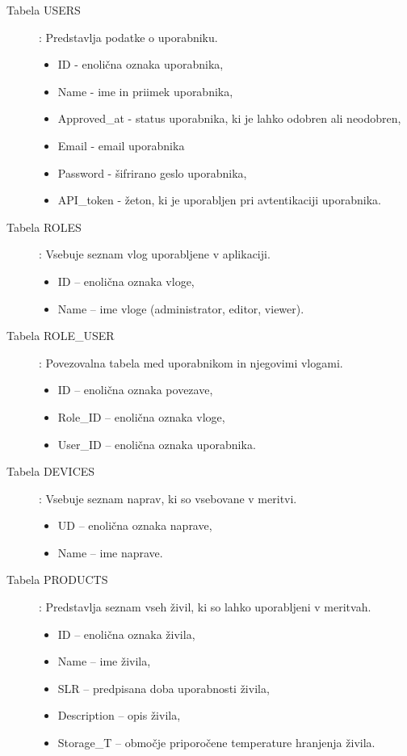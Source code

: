 \documentclass[a4paper, 12pt]{book}
\begin{document}
\begin{description}
\item[Tabela USERS] : Predstavlja podatke o uporabniku.
	\begin{itemize}
		\item ID - enolična oznaka uporabnika,
		\item Name - ime in priimek uporabnika,
		\item Approved\_at - status uporabnika, ki je lahko odobren ali neodobren,
		\item Email - email uporabnika
		\item Password - šifrirano geslo uporabnika,
		\item API\_token - žeton, ki je uporabljen pri avtentikaciji uporabnika.
	\end{itemize}	

\item[Tabela ROLES] : Vsebuje seznam vlog uporabljene v aplikaciji.
	\begin{itemize}
		\item ID – enolična oznaka vloge,
		\item Name – ime vloge (administrator, editor, viewer).
	\end{itemize}

\item[Tabela ROLE\_USER] : Povezovalna tabela med uporabnikom in njegovimi vlogami. 
	\begin{itemize}
		\item ID – enolična oznaka povezave,
		\item Role\_ID – enolična oznaka vloge,
		\item User\_ID – enolična oznaka uporabnika.
	\end{itemize}

\item[Tabela DEVICES] : Vsebuje seznam naprav, ki so vsebovane v meritvi.
	\begin{itemize}
		\item UD – enolična oznaka naprave,
		\item Name – ime naprave.
	\end{itemize}

\item[Tabela PRODUCTS] : Predstavlja seznam vseh živil, ki so lahko uporabljeni v meritvah.
	\begin{itemize}		
		\item ID – enolična oznaka živila,
		\item Name – ime živila,
		\item SLR – predpisana doba uporabnosti živila,
		\item Description – opis živila,
		\item Storage\_T – območje priporočene temperature hranjenja živila.
	\end{itemize}
	

\end{description}
\end{document}
